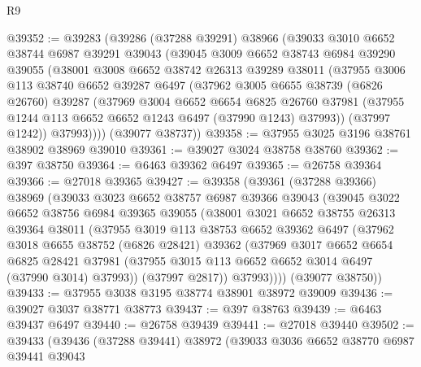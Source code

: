 \begin{lexlean}{R9}
\begin{coremodule}
@39352 := @39283
    (@39286
      (@37288 @39291)
      @38966
      (@39033
        @3010
        @6652
        @38744
        @6987
        @39291
        @39043
        (@39045
          @3009
          @6652
          @38743
          @6984
          @39290
          @39055
          (@38001
            @3008
            @6652
            @38742
            @26313
            @39289
            @38011
            (@37955
              @3006
              @113
              @38740
              @6652
              @39287
              @6497
              (@37962
                @3005
                @6655
                @38739
                (@6826 @26760)
                @39287
                (@37969
                  @3004
                  @6652
                  @6654
                  @6825
                  @26760
                  @37981
                  (@37955 @1244 @113 @6652 @6652 @1243 @6497 (@37990 @1243) @37993))
                (@37997 @1242))
              @37993))))
      (@39077 @38737))
@39358 := @37955 @3025 @3196 @38761 @38902 @38969 @39010
@39361 := @39027 @3024 @38758 @38760
@39362 := @397 @38750
@39364 := @6463 @39362 @6497
@39365 := @26758 @39364
@39366 := @27018 @39365
@39427 := @39358
    (@39361
      (@37288 @39366)
      @38969
      (@39033
        @3023
        @6652
        @38757
        @6987
        @39366
        @39043
        (@39045
          @3022
          @6652
          @38756
          @6984
          @39365
          @39055
          (@38001
            @3021
            @6652
            @38755
            @26313
            @39364
            @38011
            (@37955
              @3019
              @113
              @38753
              @6652
              @39362
              @6497
              (@37962
                @3018
                @6655
                @38752
                (@6826 @28421)
                @39362
                (@37969
                  @3017
                  @6652
                  @6654
                  @6825
                  @28421
                  @37981
                  (@37955 @3015 @113 @6652 @6652 @3014 @6497 (@37990 @3014) @37993))
                (@37997 @2817))
              @37993))))
      (@39077 @38750))
@39433 := @37955 @3038 @3195 @38774 @38901 @38972 @39009
@39436 := @39027 @3037 @38771 @38773
@39437 := @397 @38763
@39439 := @6463 @39437 @6497
@39440 := @26758 @39439
@39441 := @27018 @39440
@39502 := @39433
    (@39436
      (@37288 @39441)
      @38972
      (@39033
        @3036
        @6652
        @38770
        @6987
        @39441
        @39043

\end{coremodule}
\end{lexlean}
